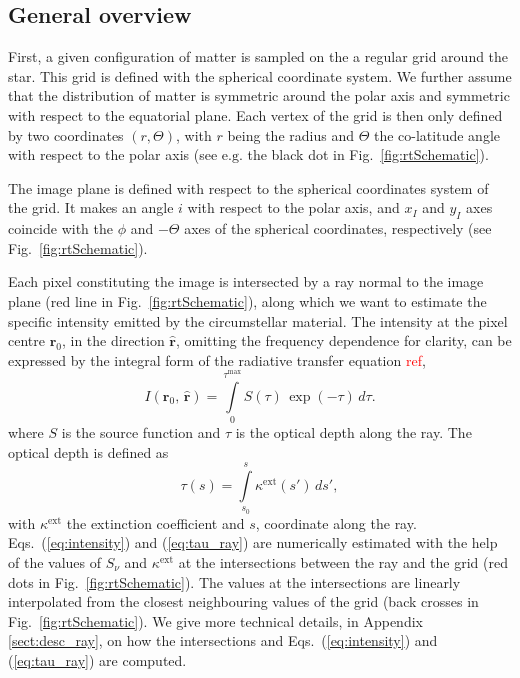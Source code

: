 \documentclass{report}
\newcommand{\eg}{\mathrm{e.g.}}
\newcommand{\rhat}{\hat{\bm{r}}}
\newcommand{\ro}{\bm{r}_0}
\newcommand{\taumax}{\tau^\mathrm{max}}
\newcommand{\kext}{\kappa^\mathrm{ext}}
\newcommand{\Snu}{S_\nu}
\begin{document}
    \subsection{General overview}
    
    First, a given configuration of matter is sampled on the a regular grid around the star. This grid is defined with the spherical coordinate system. We further assume that the distribution of matter is symmetric around the polar axis and symmetric with respect to the equatorial plane. Each vertex of the grid is then only defined by two coordinates $\left(r, \Theta\right)$, with $r$ being the radius and $\Theta$ the co-latitude angle with respect to the polar axis (see $\eg$ the black dot in Fig.~\ref{fig:rtSchematic}).
      
    The image plane is defined with respect to the spherical coordinates system of the grid. It makes an angle $i$ with respect to the polar axis, and $x_I$ and $y_I$ axes coincide with the $\phi$ and $-\Theta$ axes of the spherical coordinates, respectively (see Fig.~\ref{fig:rtSchematic}). 
      
    Each pixel constituting the image is intersected by a ray normal to the image plane (red line in Fig.~\ref{fig:rtSchematic}), along which we want to estimate the specific intensity emitted by the circumstellar material. The intensity at the pixel centre $\ro$, in the direction $\rhat$, omitting the frequency dependence for clarity, can be expressed by the integral form of the radiative transfer equation \textcolor{red}{ref},
    \begin{equation}
      I\left(\ro, \, \rhat \right) = \int \limits_{0}^{\taumax} S\left(\tau\right) \, \exp{\left(- \tau\right)} \, d\tau . \label{eq:intensity}
    \end{equation}
    where $S$ is the source function and $\tau$ is the optical depth along the ray. The optical depth is defined as 
    \begin{equation}
      \tau\left(s\right) = \int \limits_{s_0}^{s} \kext \left(s'\right) \, ds', \label{eq:tau_ray}
    \end{equation}
    with $\kext$ the extinction coefficient and $s$, coordinate along the ray. Eqs.~(\ref{eq:intensity}) and (\ref{eq:tau_ray}) are numerically estimated with the help of the values of $\Snu$ and $\kext$ at the intersections between the ray and the grid (red dots in Fig.~\ref{fig:rtSchematic}). The values at the intersections are linearly interpolated from the closest neighbouring values of the grid (back crosses in Fig.~\ref{fig:rtSchematic}). We give more technical details, in Appendix \ref{sect:desc_ray}, on how the intersections and Eqs.~(\ref{eq:intensity}) and (\ref{eq:tau_ray}) are computed.  
    
\end{document}
